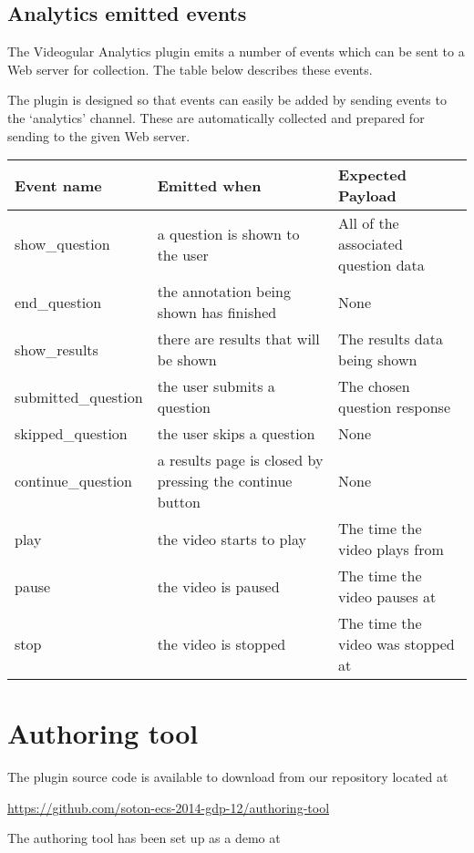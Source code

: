 \documentclass[12pt,a4paper]{article}
\begin{document}
\subsection{Analytics emitted events}

The Videogular Analytics plugin emits a number of events which can be sent to a Web server for collection. The table below describes these events.

The plugin is designed so that events can easily be added by sending events to the `analytics' channel. These are automatically collected and prepared for sending to the given Web server.

\begin{tabular}{p{3.2cm} p{7cm} p{4cm}}

\textbf{Event name} & \textbf{Emitted when} & \textbf{Expected Payload} \\ 
\hline 
show\_question & a question is shown to the user & All of the associated question data \\ 
\hline 
end\_question & the annotation being shown has finished & None \\ 
\hline 
show\_results & there are results that will be shown & The results data being shown \\ 
\hline 
submitted\_question & the user submits a question & The chosen question response \\ 
\hline 
skipped\_question & the user skips a question & None \\ 
\hline 
continue\_question & a results page is closed by pressing the continue button & None \\ 
\hline 
play & the video starts to play & The time the video plays from \\ 
\hline 
pause & the video is paused & The time the video pauses at \\ 
\hline 
stop & the video is stopped & The time the video was stopped at \\
\end{tabular} 


\section{Authoring tool}

The plugin source code is available to download from our repository located at 

\url{https://github.com/soton-ecs-2014-gdp-12/authoring-tool}

The authoring tool has been set up as a demo at
\end{document}
